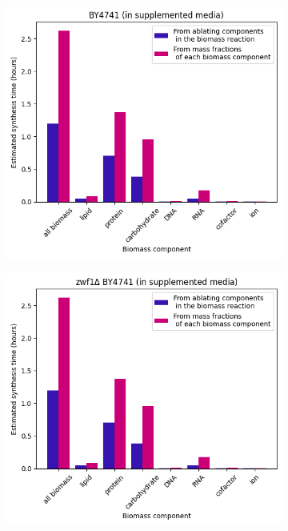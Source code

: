 \begin{figure}
  \centering
  \begin{subfigure}[htpb]{0.45\textwidth}
   \centering
   \includegraphics[width=\textwidth]{ablation_by4741}
   \caption{
   }
   \label{fig:model-ablation-by4741}
  \end{subfigure}
  \begin{subfigure}[htpb]{0.45\textwidth}
   \centering
   \includegraphics[width=\textwidth]{ablation_zwf1}

\end{subfigure}
\end{figure}
